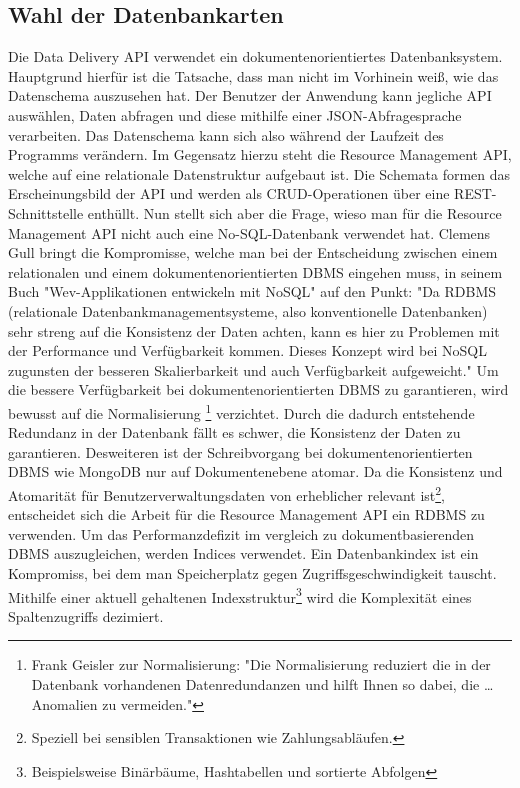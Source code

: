 
\subsection{Wahl der Datenbankarten}
\label{subsec:wahlderdatenbankarten}
Die Data Delivery API verwendet ein dokumentenorientiertes Datenbanksystem.
Hauptgrund hierfür ist die Tatsache, dass man nicht im Vorhinein weiß, wie das
Datenschema auszusehen hat. Der Benutzer der Anwendung kann jegliche API
auswählen, Daten abfragen und diese mithilfe einer JSON-Abfragesprache verarbeiten. Das Datenschema
kann sich also während der Laufzeit des Programms verändern. Im Gegensatz hierzu steht die Resource
Management API, welche auf eine relationale Datenstruktur aufgebaut ist. Die Schemata formen das
Erscheinungsbild der API und werden als CRUD-Operationen über eine REST-Schnittstelle enthüllt.
Nun stellt sich aber die Frage, wieso man für die Resource Management API nicht auch eine
No-SQL-Datenbank verwendet hat. Clemens Gull bringt die Kompromisse, welche man bei der
Entscheidung zwischen einem relationalen und einem dokumentenorientierten DBMS
eingehen muss, in seinem Buch "Wev-Applikationen entwickeln mit NoSQL" auf den Punkt:
"Da RDBMS (relationale Datenbankmanagementsysteme, also konventionelle Datenbanken) sehr streng
auf die Konsistenz der Daten achten, kann es hier zu Problemen mit der Performance und Verfügbarkeit
kommen. Dieses Konzept wird bei NoSQL zugunsten der besseren Skalierbarkeit und auch Verfügbarkeit
aufgeweicht."\cite[S. 18]{NoSQLClemensGull} Um die bessere Verfügbarkeit bei dokumentenorientierten
DBMS zu garantieren, wird bewusst auf die Normalisierung
\footnote{Frank Geisler zur Normalisierung: "Die Normalisierung reduziert die in der Datenbank vorhandenen Datenredundanzen und hilft Ihnen so dabei, die \dots Anomalien zu vermeiden."\cite[S. 177]{DatenbankenFrankGeisler}}
verzichtet. Durch die dadurch entstehende Redundanz in der Datenbank fällt es schwer,
die Konsistenz der Daten zu garantieren. Desweiteren ist der Schreibvorgang bei dokumentenorientierten
DBMS wie MongoDB nur auf Dokumentenebene atomar.\cite{MongoDBAtomaritaet} Da die Konsistenz und Atomarität für
Benutzerverwaltungsdaten von erheblicher relevant ist\footnote{Speziell bei sensiblen Transaktionen wie Zahlungsabläufen.}, 
entscheidet sich die Arbeit für die Resource Management API ein RDBMS zu verwenden.
Um das Performanzdefizit im vergleich zu dokumentbasierenden DBMS auszugleichen,
werden Indices verwendet. Ein Datenbankindex ist ein Kompromiss, bei dem
man Speicherplatz gegen Zugriffsgeschwindigkeit tauscht.\cite{YoutubePostgresIndexing}
Mithilfe einer aktuell gehaltenen Indexstruktur\footnote{Beispielsweise Binärbäume, Hashtabellen und sortierte Abfolgen}
wird die Komplexität eines Spaltenzugriffs dezimiert.

